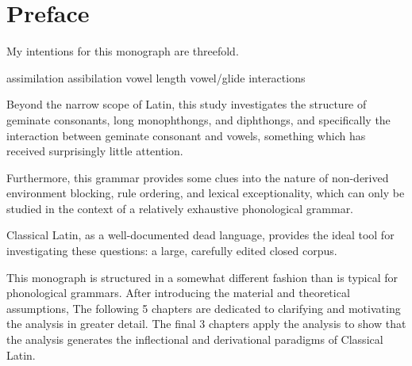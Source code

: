 \chapter*{Preface}

My intentions for this monograph are threefold.

assimilation
assibilation
vowel length
vowel/glide interactions

Beyond the narrow scope of Latin, this study investigates the structure of geminate consonants, long monophthongs, and diphthongs, and specifically the interaction between geminate consonant and vowels, something which has received surprisingly little attention.

Furthermore, this grammar provides some clues into the nature of non-derived environment blocking, rule ordering, and lexical exceptionality, which can only be studied in the context of a relatively exhaustive phonological grammar.

Classical Latin, as a well-documented dead language, provides the ideal tool for investigating these questions: a large, carefully edited closed corpus.

This monograph is structured in a somewhat different fashion than is typical for phonological grammars.
After introducing the material and theoretical assumptions, 
The following 5 chapters are dedicated to clarifying and motivating the analysis in greater detail.
The final 3 chapters apply the analysis to show that the analysis generates the inflectional and derivational paradigms of Classical Latin.

